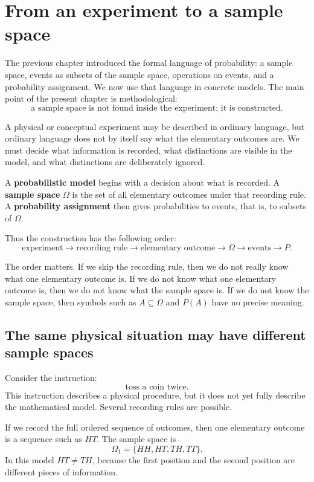 \section{From an experiment to a sample space}

The previous chapter introduced the formal language of probability: a sample
space, events as subsets of the sample space, operations on events, and a
probability assignment. We now use that language in concrete models. The main
point of the present chapter is methodological:
\[
\text{a sample space is not found inside the experiment; it is constructed.}
\]

A physical or conceptual experiment may be described in ordinary language, but
ordinary language does not by itself say what the elementary outcomes are. We
must decide what information is recorded, what distinctions are visible in the
model, and what distinctions are deliberately ignored.

\begin{definitionbox}
A \textbf{probabilistic model} begins with a decision about what is recorded. A
\textbf{sample space} \(\Omega\) is the set of all elementary outcomes under
that recording rule. A \textbf{probability assignment} then gives probabilities
to events, that is, to subsets of \(\Omega\).
\end{definitionbox}

Thus the construction has the following order:
\[
\text{experiment}
\longrightarrow
\text{recording rule}
\longrightarrow
\text{elementary outcome}
\longrightarrow
\Omega
\longrightarrow
\text{events}
\longrightarrow
P.
\]

The order matters. If we skip the recording rule, then we do not really know
what one elementary outcome is. If we do not know what one elementary outcome is,
then we do not know what the sample space is. If we do not know the sample space,
then symbols such as \(A\subseteq\Omega\) and \(P(A)\) have no precise meaning.

\subsection*{The same physical situation may have different sample spaces}

Consider the instruction:
\[
\text{toss a coin twice.}
\]
This instruction describes a physical procedure, but it does not yet fully
describe the mathematical model. Several recording rules are possible.

If we record the full ordered sequence of outcomes, then one elementary outcome
is a sequence such as \(HT\). The sample space is
\[
\Omega_1=\{HH,HT,TH,TT\}.
\]
In this model \(HT\neq TH\), because the first position and the second position
are different pieces of information.

